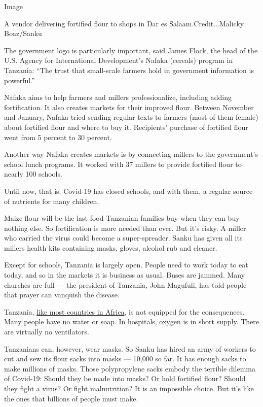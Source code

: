 Image

A vendor delivering fortified flour to shops in Dar es
Salaam.Credit...Malicky Boaz/Sanku

The government logo is particularly important, said James Flock, the
head of the U.S. Agency for International Development's Nafaka (cereals)
program in Tanzania: ``The trust that small-scale farmers hold in
government information is powerful.''

Nafaka aims to help farmers and millers professionalize, including
adding fortification. It also creates markets for their improved flour.
Between November and January, Nafaka tried sending regular texts to
farmers (most of them female) about fortified flour and where to buy it.
Recipients' purchase of fortified flour went from 5 percent to 30
percent.

Another way Nafaka creates markets is by connecting millers to the
government's school lunch programs. It worked with 37 millers to provide
fortified flour to nearly 100 schools.

Until now, that is. Covid-19 has closed schools, and with them, a
regular source of nutrients for many children.

Maize flour will be the last food Tanzanian families buy when they can
buy nothing else. So fortification is more needed than ever. But it's
risky. A miller who carried the virus could become a super-spreader.
Sanku has given all its millers health kits containing masks, gloves,
alcohol rub and cleaner.

Except for schools, Tanzania is largely open. People need to work today
to eat today, and so in the markets it is business as usual. Buses are
jammed. Many churches are full --- the president of Tanzania, John
Magufuli, has told people that prayer can vanquish the disease.

Tanzania,
\href{https://www.nytimes.com/2020/04/18/world/africa/africa-coronavirus-ventilators.html}{like
most countries in Africa}, is not equipped for the consequences. Many
people have no water or soap. In hospitals, oxygen is in short supply.
There are virtually no ventilators.

Tanzanians can, however, wear masks. So Sanku has hired an army of
workers to cut and sew its flour sacks into masks --- 10,000 so far. It
has enough sacks to make millions of masks. Those polypropylene sacks
embody the terrible dilemma of Covid-19: Should they be made into masks?
Or hold fortified flour? Should they fight a virus? Or fight
malnutrition? It is an impossible choice. But it's like the ones that
billions of people must make.


